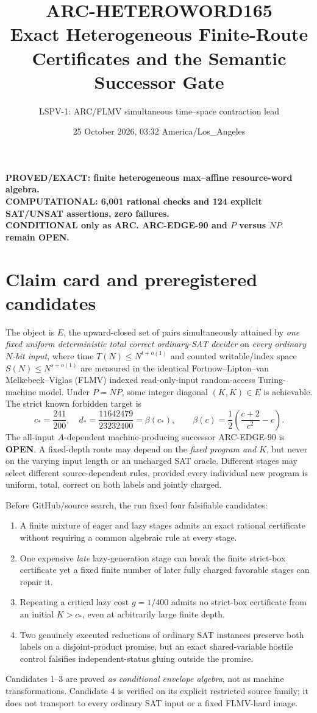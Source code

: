 \documentclass[11pt]{article}
\title{ARC-HETEROWORD165\\
\large Exact Heterogeneous Finite-Route Certificates and the Semantic Successor Gate}
\author{LSPV-1: ARC/FLMV simultaneous time--space contraction lead}
\date{25 October 2026, 03:32 America/Los\_Angeles}
\newcommand{\OPEN}{\textbf{OPEN}}
\begin{document}
\maketitle
\begin{center}
\textbf{PROVED/EXACT: finite heterogeneous max--affine resource-word algebra.}\\
\textbf{COMPUTATIONAL: 6,001 rational checks and 124 explicit SAT/UNSAT assertions, zero failures.}\\
\textbf{CONDITIONAL only as ARC. ARC-EDGE-90 and $P$ versus $NP$ remain OPEN.}
\end{center}

\section{Claim card and preregistered candidates}
The object is $E$, the upward-closed set of pairs simultaneously attained by
\emph{one fixed uniform deterministic total correct ordinary-SAT decider}
on \emph{every ordinary $N$-bit input}, where time
$T(N)\le N^{t+o(1)}$ and counted writable/index space
$S(N)\le N^{s+o(1)}$ are measured in the identical
Fortnow--Lipton--van Melkebeek--Viglas (FLMV) indexed
read-only-input random-access Turing-machine model.
Under $P=NP$, some integer diagonal $(K,K)\in E$ is achievable.
The strict known forbidden target is
\[
 c_*=\frac{241}{200},\quad
 d_*=\frac{11642479}{23232400}
 =\beta(c_*),\qquad
 \beta(c)=\frac12\left(\frac{c+2}{c^2}-c\right).
\]
The all-input $A$-dependent machine-producing successor
ARC-EDGE-90 is \OPEN. A fixed-depth route may depend on the
\emph{fixed program and $K$}, but never on the varying input length
or an uncharged SAT oracle. Different stages may select different
source-dependent rules, provided every individual new program
is uniform, total, correct on both labels and jointly charged.

Before GitHub/source search, the run fixed four falsifiable candidates:
\begin{enumerate}
\item A finite mixture of eager and lazy stages admits an exact rational
certificate without requiring a common algebraic rule at every stage.
\item One expensive \emph{late} lazy-generation stage can break the
finite strict-box certificate yet a fixed finite number of
later fully charged favorable stages can repair it.
\item Repeating a critical lazy cost $g=1/400$ admits no strict-box
certificate from an initial $K>c_*$, even at arbitrarily large finite depth.
\item Two genuinely executed reductions of ordinary SAT instances
preserve both labels on a disjoint-product promise, but an exact
shared-variable hostile control falsifies independent-status gluing
outside the promise.
\end{enumerate}
Candidates 1--3 are proved \emph{as conditional envelope algebra},
not as machine transformations. Candidate 4 is verified
on its explicit restricted source family; it does not transport to
every ordinary SAT input or a fixed FLMV-hard image.
\end{document}
